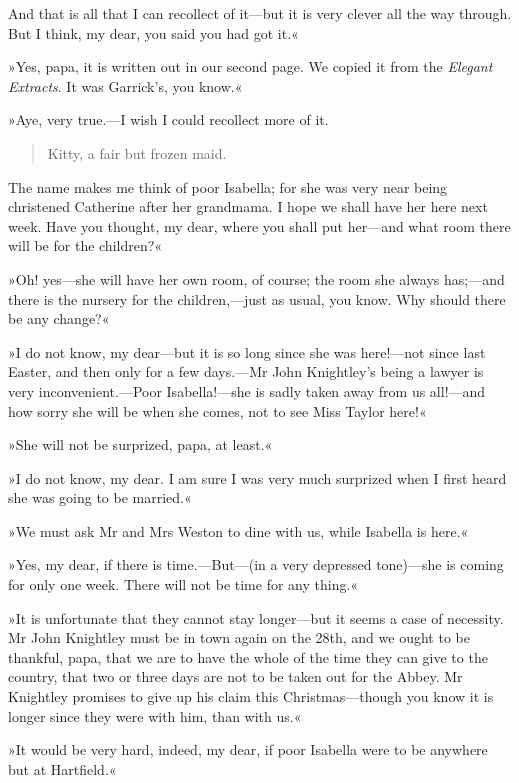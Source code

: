 And that is all that I can recollect of it—but it is very clever all the way through. But I think, my dear, you said you had got it.«

»Yes, papa, it is written out in our second page. We copied it from the \textit{Elegant Extracts}. It was Garrick's, you know.«

»Aye, very true.—I wish I could recollect more of it.

\begin{quote}
Kitty, a fair but frozen maid.
\end{quote}

The name makes me think of poor Isabella; for she was very near being christened Catherine after her grandmama. I hope we shall have her here next week. Have you thought, my dear, where you shall put her—and what room there will be for the children?«

»Oh! yes—she will have her own room, of course; the room she always has;—and there is the nursery for the children,—just as usual, you know. Why should there be any change?«

»I do not know, my dear—but it is so long since she was here!—not since last Easter, and then only for a few days.—Mr John Knightley's being a lawyer is very inconvenient.—Poor Isabella!—she is sadly taken away from us all!—and how sorry she will be when she comes, not to see Miss Taylor here!«

»She will not be surprized, papa, at least.«

»I do not know, my dear. I am sure I was very much surprized when I first heard she was going to be married.«

»We must ask Mr and Mrs Weston to dine with us, while Isabella is here.«

»Yes, my dear, if there is time.—But—(in a very depressed tone)—she is coming for only one week. There will not be time for any thing.«

»It is unfortunate that they cannot stay longer—but it seems a case of necessity. Mr John Knightley must be in town again on the 28th, and we ought to be thankful, papa, that we are to have the whole of the time they can give to the country, that two or three days are not to be taken out for the Abbey. Mr Knightley promises to give up his claim this Christmas—though you know it is longer since they were with him, than with us.«

»It would be very hard, indeed, my dear, if poor Isabella were to be anywhere but at Hartfield.«

